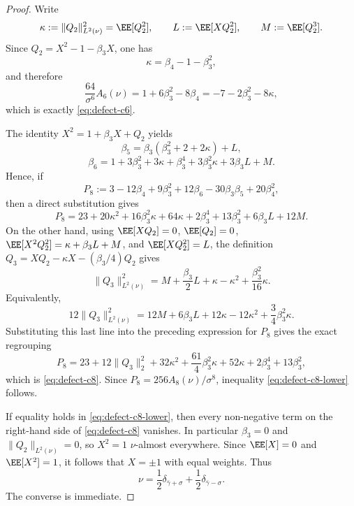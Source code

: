 \begin{proof}
Write
\[
\kappa:=\|Q_2\|_{L^2(\nu)}^2=\EE[Q_2^2],
\qquad
L:=\EE[XQ_2^2],
\qquad
M:=\EE[Q_2^3].
\]
Since $Q_2=X^2-1-\beta_3X$, one has
\[
\kappa=\beta_4-1-\beta_3^2,
\]
and therefore
\[
\frac{64}{\sigma^6}A_6(\nu)
=1+6\beta_3^2-8\beta_4
=-7-2\beta_3^2-8\kappa,
\]
which is exactly \eqref{eq:defect-c6}.

The identity $X^2=1+\beta_3X+Q_2$ yields
\[
\beta_5=\beta_3(\beta_3^2+2+2\kappa)+L,
\]
\[
\beta_6=1+3\beta_3^2+3\kappa+\beta_3^4+3\beta_3^2\kappa+3\beta_3L+M.
\]
Hence, if
\[
P_8:=3-12\beta_4+9\beta_3^2+12\beta_6-30\beta_3\beta_5+20\beta_4^2,
\]
then a direct substitution gives
\[
P_8
=23+20\kappa^2+16\beta_3^2\kappa+64\kappa+2\beta_3^4+13\beta_3^2+6\beta_3L+12M.
\]
On the other hand,
using $\EE[XQ_2]=0$, $\EE[Q_2]=0$, $\EE[X^2Q_2^2]=\kappa+\beta_3L+M$, and
$\EE[XQ_2^2]=L$, the definition
$Q_3=XQ_2-\kappa X-(\beta_3/4)Q_2$ gives
\[
\|Q_3\|_{L^2(\nu)}^2
=M+\frac{\beta_3}{2}L+\kappa-\kappa^2+\frac{\beta_3^2}{16}\kappa.
\]
Equivalently,
\[
12\|Q_3\|_{L^2(\nu)}^2
=12M+6\beta_3L+12\kappa-12\kappa^2+\frac34\beta_3^2\kappa.
\]
Substituting this last line into the preceding expression for $P_8$ gives
the exact regrouping
\[
P_8=23+12\|Q_3\|_2^2+32\kappa^2
+\frac{61}{4}\beta_3^2\kappa+52\kappa+2\beta_3^4+13\beta_3^2,
\]
which is \eqref{eq:defect-c8}.  Since
$P_8=256A_8(\nu)/\sigma^8$, inequality
\eqref{eq:defect-c8-lower} follows.

If equality holds in \eqref{eq:defect-c8-lower}, then every non-negative
term on the right-hand side of \eqref{eq:defect-c8} vanishes.  In
particular $\beta_3=0$ and $\|Q_2\|_{L^2(\nu)}=0$, so $X^2=1$
$\nu$-almost everywhere.  Since $\EE[X]=0$ and $\EE[X^2]=1$, it follows
that $X=\pm 1$ with equal weights.  Thus
\[
\nu=\frac12\delta_{\bar{\gamma}+\sigma}
+\frac12\delta_{\bar{\gamma}-\sigma}.
\]
The converse is immediate.
\end{proof}

